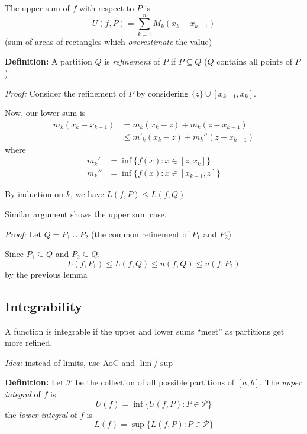 \documentclass[12pt]{report}
\newenvironment*{tbox}[2][gray]{
    \begin{tcolorbox}[
        parbox=false,
        colback=#1!5!white,
        colframe=#1!75!black,
        breakable,
        title={#2}
    ]}
    {\end{tcolorbox}}
\begin{document}
    The upper sum of $f$ with respect to $P$ is
    \[U(f, P) = \sum_{k=1}^n M_k(x_k - x_{k-1})\]
    (sum of areas of rectangles which \emph{overestimate} the value) 

    \textbf{Definition:} A partition $Q$ is \emph{refinement} of $P$ if $P \subseteq Q$ ($Q$ contains all points of $P$)    

    \begin{tbox}{\textbf{Lemma:} If $P \subseteq Q$, then $L(f, P) \leq L(f, Q)$ and $u(f, P) \geq u(f, Q)$}
        \emph{Proof:} Consider the refinement of $P$ by considering $\{z\} \cup [x_{k-1}, x_k]$.

        Now, our lower sum is 
        \begin{align*}
            m_k(x_k - x_{k-1}) &= m_k(x_k - z) + m_k(z - x_{k-1})\\ 
            &\leq m'_k(x_k - z) + m_k'' (z - x_{k-1})
        \end{align*}
        where 
        \begin{align*}
            m_k' &= \inf\{f(x): x \in [z, x_k]\}\\
            m_k'' &= \inf\{f(x): x \in [x_{k-1}, z]\}
        \end{align*}

        By induction on $k$, we have $L(f, P) \leq L(f, Q)$

        Similar argument shows the upper sum case. 
    \end{tbox}

    \begin{tbox}{\textbf{Lemma:} If $P_1$ and $P_2$e are any two partitions of $[a, b]$, then $L(f, P_1) \leq u(f, P_2)$}
        \emph{Proof:} Let $Q = P_1 \cup P_2$ (the common refinement of $P_1$ and $P_2$) 

        Since $P_1 \subseteq Q$ and $P_2 \subseteq Q$, 
        \[L(f, P_1) \leq L(f, Q) \leq u(f, Q) \leq u(f, P_2)\]
        by the previous lemma
    \end{tbox}

    \subsection*{Integrability}
    A function is integrable if the upper and lower sums ``meet'' as partitions get more refined. 

    \emph{Idea:} instead of limits, use AoC and $\lim$/$\sup$

    \textbf{Definition:} Let $\mathcal{P}$ be the collection of all possible partitions of $[a, b]$. The \emph{upper integral} of $f$ is 
    \[U(f) = \inf\{U(f, P): P \in \mathcal{P}\}\]
    the \emph{lower integral} of $f$ is 
    \[L(f) = \sup\{L(f, P) : P \in \mathcal{P}\}\]
\end{document}
